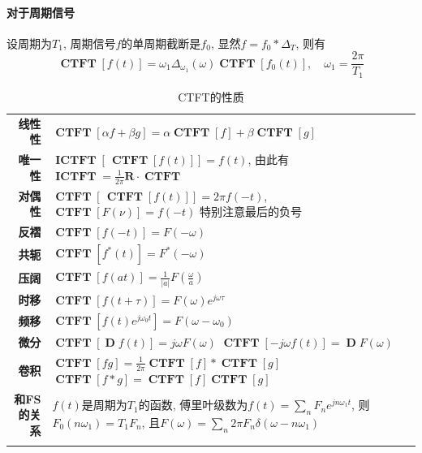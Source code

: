\documentclass{ctexart}
\DeclareMathOperator{\CTFT}{\mathbf{CTFT}}
\DeclareMathOperator{\ICTFT}{\mathbf{ICTFT}}
\DeclareMathOperator{\D}{\mathbf{D}}
\newlength{\Oldarrayrulewidth}
\newcommand{\Hline}[1]{
  \noalign{\global\setlength{\Oldarrayrulewidth}{\arrayrulewidth}}
  \noalign{\global\setlength{\arrayrulewidth}{#1}}\hline
  \noalign{\global\setlength{\arrayrulewidth}{\Oldarrayrulewidth}}}
\newcommand{\Topline}{\Hline{0.08em}}
\newcommand{\Bottomline}{\Hline{0.08em}}
\begin{document}
\paragraph{对于周期信号}
    设周期为$T_1$, 周期信号$f$的单周期截断是$f_0$, 显然$f = f_0 * \Delta_T$,
    则有 \[
        \CTFT[ f(t) ] = \omega_1 \Delta_{\omega_1}(\omega) \CTFT[ f_0(t) ] ,\quad \omega_1 = \frac{2\pi}{T_1}  \]

    \begin{table}[ht!]
    \begin{tabularx}{\textwidth}{|>{\bfseries}r  L|}
        \Topline
        线性性          & $\displaystyle \CTFT[\alpha f + \beta g] = \alpha \CTFT[f] + \beta \CTFT[g]$\\
        唯一性          & $\displaystyle \ICTFT[ \, \CTFT[f(t)] ] = f(t)$,
                            由此有$\displaystyle \ICTFT = \frac{1}{2\pi} \mathbf{R} \cdot \CTFT$\\
        对偶性          & $\displaystyle \CTFT [ \, \CTFT[ f(t) ] ] = 2 \pi f(-t)$, $\displaystyle \CTFT [ F(\nu) ] = f(-t)$
                            特别注意最后的负号\\
        反褶            & $\displaystyle \CTFT[f(-t)] = F(-\omega)$\\
        共轭            & $\displaystyle \CTFT[f^*(t)] = F^*(-\omega)$\\
        压阔            & $\displaystyle \CTFT[f(at)] = \frac{1}{|a|} F(\frac{\omega}{a})$\\
        时移            & $\displaystyle \CTFT[f(t + \tau)] = F(\omega) e^{j \omega \tau}$\\
        频移            & $\displaystyle \CTFT[f(t) e^{j \omega_0 t}] = F(\omega - \omega_0)$\\
        微分            & $\displaystyle \CTFT[\D f(t)] = j \omega F(\omega)$ \newline
                            $\CTFT[-j \omega f(t)] = \D F(\omega)$\\
        卷积            & $\displaystyle \CTFT[f g] = \frac{1}{2\pi} \CTFT[f] * \CTFT[g]$\newline
                            $\CTFT[f * g] = \CTFT[f] \CTFT[g]$\\
        和FS的关系      & $f(t)$是周期为$T_1$的函数, 傅里叶级数为$f(t) = \sum_n F_n e^{j n \omega_1 t}$,
            则$F_0(n\omega_1) = T_1 F_n$, 且$F(\omega) = \sum_n 2\pi F_n \delta(\omega - n \omega_1)$\\
        \Bottomline
    \end{tabularx}
    \caption{CTFT的性质}
    \end{table}
\end{document}
